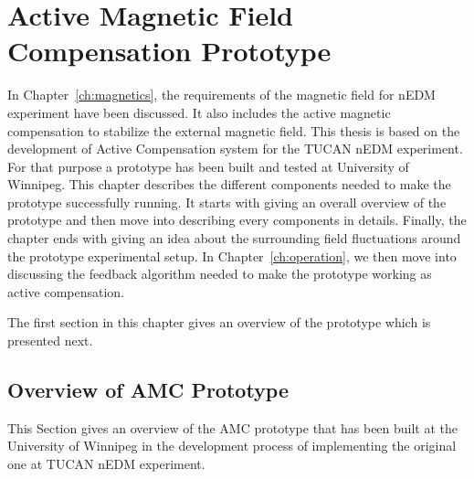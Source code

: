 \chapter{Active Magnetic Field Compensation Prototype}\label{ch:amcP}

In Chapter~\ref{ch:magnetics}, the requirements of the magnetic field for nEDM experiment have been discussed. It also includes the active magnetic compensation to stabilize the external magnetic field. This thesis is based on the development of Active Compensation system for the TUCAN nEDM experiment. For that purpose a prototype has been built and tested at University of Winnipeg. This chapter describes the different components needed to make the prototype successfully running. It starts with giving an overall overview of the prototype and then move into describing every components in details. Finally, the chapter ends with giving an idea about the surrounding field fluctuations around the prototype experimental setup. In Chapter~\ref{ch:operation}, we then move into discussing the feedback algorithm needed to make the prototype working as active compensation.

The first section in this chapter gives an overview of the prototype which is presented next.



\section{Overview of AMC Prototype}\label{sec:amcp_overview}
This Section gives an overview of the AMC prototype that has been built at the University of Winnipeg in the development process of implementing the original one at TUCAN nEDM experiment.


